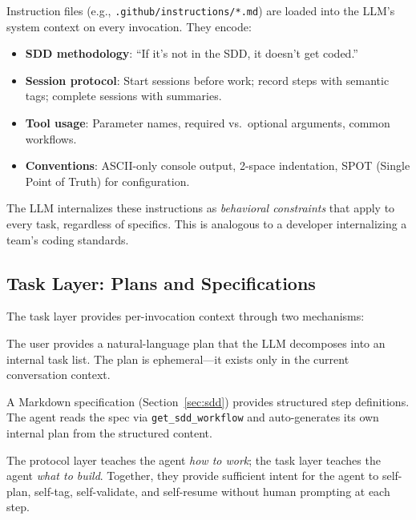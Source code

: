 \documentclass[11pt,letterpaper]{article}
\begin{document}
Instruction files (e.g., \texttt{.github/instructions/*.md}) are loaded
into the LLM's system context on every invocation.  They encode:

\begin{itemize}[nosep]
    \item \textbf{SDD methodology}: ``If it's not in the SDD, it doesn't
          get coded.''
    \item \textbf{Session protocol}: Start sessions before work; record
          steps with semantic tags; complete sessions with summaries.
    \item \textbf{Tool usage}: Parameter names, required vs.\ optional
          arguments, common workflows.
    \item \textbf{Conventions}: ASCII-only console output, 2-space
          indentation, SPOT (Single Point of Truth) for configuration.
\end{itemize}

The LLM internalizes these instructions as \emph{behavioral constraints}
that apply to every task, regardless of specifics.  This is analogous
to a developer internalizing a team's coding standards.

\subsection{Task Layer: Plans and Specifications}

The task layer provides per-invocation context through two mechanisms:

\begin{description}[nosep]
    \item[Explicit plans (\texttt{/plan}):]
    The user provides a natural-language plan that the LLM decomposes
    into an internal task list.  The plan is ephemeral---it exists only
    in the current conversation context.

    \item[Workflow specifications:]
    A Markdown specification (Section~\ref{sec:sdd}) provides structured
    step definitions.  The agent reads the spec via
    \texttt{get\_sdd\_workflow} and auto-generates its own internal plan
    from the structured content.
\end{description}

\begin{keyinsight}
The protocol layer teaches the agent \emph{how to work}; the task layer
teaches the agent \emph{what to build}.  Together, they provide
sufficient intent for the agent to self-plan, self-tag, self-validate,
and self-resume without human prompting at each step.
\end{keyinsight}
\end{document}
